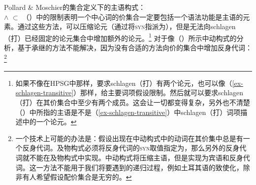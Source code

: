 \ea
Pollard \& Moschier的集合定义下的主语构式：\\
 $\wedge$  $\subset$ 
\z
（）中的限制表明一个中心词的价集合一定要包括一个语法功能是主语的元素。通过这些方法，可以压缩论元（通过将\textsc{syn}指派为），但是无法向schlagen（打）已经固定的论元集合中增加额外的论元。\footnote{%
如果不像在HPSG中那样，要求schlagen（打）有两个论元，也可以像（\ref{ex-schlagen-transitive}）那样，给主要词项假设限制。然后就可以要求schlagen（打）在其价集合中至少有两个成员。这会让一切都变得复杂，另外也不清楚（）中所指的主语是不是（\ref{ex-schlagen-transitive}）中schlagen（打）词项描述中的一个论元。}
对于像（）所示中动构式的分析，基于承继的方法不能解决，因为没有合适的方法向价的集合中增加反身代词：\footnote{%
一个技术上可能的办法是：假设出现在中动构式中的动词在其价集中总是有一个反身代词。及物构式必须将反身代词的\textsc{syn}取值指定为，那么另外的反身代词就不能在及物构式中实现。中动构式将压缩主语，但是实现为宾语和反身代词。这一方法不能用于我们将要遇到的递归过程，例如土耳其语的致使化，除非有人希望假设配价集合是无穷的。
}
